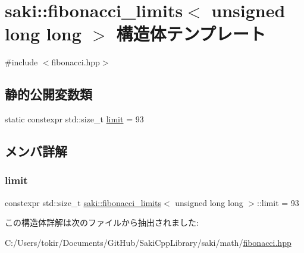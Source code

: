 \hypertarget{structsaki_1_1fibonacci__limits_3_01unsigned_01long_01long_01_4}{}\section{saki\+:\+:fibonacci\+\_\+limits$<$ unsigned long long $>$ 構造体テンプレート}
\label{structsaki_1_1fibonacci__limits_3_01unsigned_01long_01long_01_4}


{\ttfamily \#include $<$fibonacci.\+hpp$>$}

\subsection*{静的公開変数類}
\begin{DoxyCompactItemize}
\item 
static constexpr std\+::size\+\_\+t \mbox{\hyperlink{structsaki_1_1fibonacci__limits_3_01unsigned_01long_01long_01_4_a4c24f74fe4ee675c46ae8306e21613e0}{limit}} = 93
\end{DoxyCompactItemize}


\subsection{メンバ詳解}
\mbox{\label{structsaki_1_1fibonacci__limits_3_01unsigned_01long_01long_01_4_a4c24f74fe4ee675c46ae8306e21613e0}} 
\subsubsection{\texorpdfstring{limit}{limit}}
{\footnotesize\ttfamily constexpr std\+::size\+\_\+t \mbox{\hyperlink{structsaki_1_1fibonacci__limits}{saki\+::fibonacci\+\_\+limits}}$<$ unsigned long long $>$\+::limit = 93\hspace{0.3cm}{\ttfamily [static]}}



この構造体詳解は次のファイルから抽出されました\+:\begin{DoxyCompactItemize}
\item 
C\+:/\+Users/tokir/\+Documents/\+Git\+Hub/\+Saki\+Cpp\+Library/saki/math/\mbox{\hyperlink{fibonacci_8hpp}{fibonacci.\+hpp}}\end{DoxyCompactItemize}
